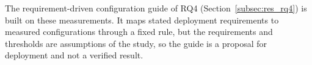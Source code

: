 The requirement-driven configuration guide of RQ4 (Section~\ref{subsec:res_rq4}) is built on these measurements. It maps stated deployment requirements to measured configurations through a fixed rule, but the requirements and thresholds are assumptions of the study, so the guide is a proposal for deployment and not a verified result.

